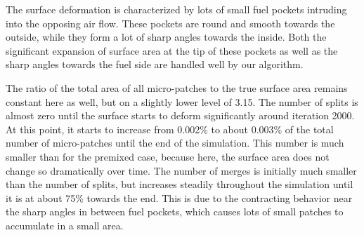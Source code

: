 %
The surface deformation is characterized by lots of small fuel pockets intruding
into the opposing air flow.
%
These pockets are round and smooth towards the outside, while they form a lot of
sharp angles towards the inside.
%
Both the significant expansion of surface area at the tip of these pockets as
well as the sharp angles towards the fuel side are handled well by our
algorithm.
%

%
The ratio of the total area of all micro-patches to the true surface area
remains constant here as well, but on a slightly lower level of 3.15.
%
The number of splits is almost zero until the surface starts to deform
significantly around iteration 2000.
%
At this point, it starts to increase from 0.002\% to about 0.003\% of the total
number of micro-patches until the end of the simulation.
%
This number is much smaller than for the premixed case, because here, the
surface area does not change so dramatically over time.
%
The number of merges is initially much smaller than the number of splits, but
increases steadily throughout the simulation until it is at about 75\% towards
the end.
%
This is due to the contracting behavior near the sharp angles in between fuel
pockets, which causes lots of small patches to accumulate in a small area.
%
%
